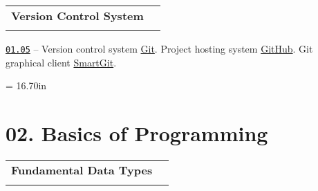 \documentclass[a4paper,12pt]{article}
\renewenvironment{itemize}
{
    \begin{list}{\labelitemi}
    {
      \setlength{\topsep}{0pt}
      \setlength{\partopsep}{0pt}
      \setlength{\parskip}{0pt}
      \setlength{\itemsep}{0pt}
      \setlength{\parsep}{0pt}
      \setlength{\leftmargin}{14.5pt}
    }
}{\end{list}}
\begin{document}
\bigskip\medskip

\begin{tabular}{!{\vrule width 1pt}L{4.7cm}!{\vrule width 1pt}L{14.3cm}!{\vrule width 0pt}} 


\textbf{Version Control System} & \\


\end{tabular}

\medskip\smallskip

\begin{itemize}

    \item \href{https://github.com/i-s-m-mipt/Education/blob/master/projects/examples/source/01.05.pdf}{\texttt{01.05}} -- Version control system \href{https://git-scm.com/}{Git}. Project hosting system \href{https://github.com/}{GitHub}. Git graphical client \href{https://www.smartgit.dev/}{SmartGit}.
    
\end{itemize}



\newpage\thispagestyle{empty}\pdfpageheight = 16.70in\enlargethispage{100in}

\section{02. Basics of Programming}

\begin{tabular}{!{\vrule width 1pt}L{5.0cm}!{\vrule width 1pt}L{14.0cm}!{\vrule width 0pt}} 


\textbf{Fundamental Data Types} & \\


\end{tabular}

\medskip\smallskip
\end{document}

